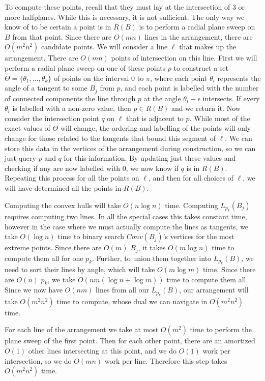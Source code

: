 \documentclass{cccg12}
\begin{document}
To compute these points, recall that they must lay at the intersection of 3 or more halfplanes. While this is necessary, it is not sufficient. The only way we know of to be certain a point is in $R(B)$ is to perform a radial plane sweep on $B$ from that point. Since there are $O(mn)$ lines in the arrangement, there are $O(m^2n^2)$ candidate points. We will consider a line $\ell$ that makes up the arrangement. There are $O(mn)$ points of intersection on this line. First we will perform a radial plane sweep on one of these points $p$ to construct a set $\Theta = \{\theta_1, \dots, \theta_k\}$ of points on the interval $0$ to $\pi$, where each point $\theta_i$ represents the angle of a tangent to some $B_j$ from $p$, and each point is labelled with the number of connected components the line through $p$ at the angle  $\theta_i + \epsilon$ intersects. If every $\theta_i$ is labelled with a non-zero value, then $p \in R(B)$ and we return it. Now consider the intersection point $q$ on $\ell$ that is adjacent to $p$. While most of the exact values of $\Theta$ will change, the ordering and labelling of the points will only change for those related to the tangents that bound this segment of $\ell$. We can store this data in the vertices of the arrangement during construction, so we can just query $p$ and $q$ for this information. By updating just these values and checking if any are now labelled with $0$, we now know if $q$ is in $R(B)$. Repeating this process for all the points on $\ell$, and then for all choices of $\ell$, we will have determined all the points in $R(B)$.

Computing the convex hulls will take $O(n \log n)$ time. Computing $L_{p_k}(B_j)$ requires computing two lines. In all the special cases this takes constant time, however in the case where we must actually compute the lines as tangents, we take $O(\log n)$ time to binary search $Conv(B_j)$'s vertices for the most extreme points. Since there are $O(m)$ $B_j$, it takes $O(m \log n)$ time to compute them all for one $p_k$. Further, to union them together into $L_{p_k}(B)$, we need to sort their lines by angle, which will take $O(m \log m)$ time. Since there are $O(n)$ $p_k$, we take $O(nm(\log n +\log m))$ time to compute them all. Since we now have $O(nm)$ lines from all our $L_{p_k}(B)$, our arrangement will take $O(m^2n^2)$ time to compute, whose dual we can navigate in $O(m^2n^2)$ time.\cite{Berg08}

For each line of the arrangement we take at most $O(m^2)$ time to perform the plane sweep of the first point. Then for each other point, there are an amortized $O(1)$  other lines intersecting at this point, and we do $O(1)$ work per intersection, so we do $O(mn)$ work per line. Therefore this step takes $O(m^2n^2)$ time. 
\end{document}
